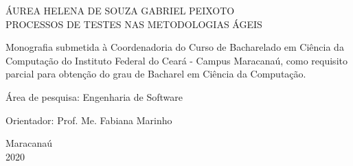 \begin{titlepage}
\vfill
\begin{center}

    {\large ÁUREA HELENA DE SOUZA GABRIEL PEIXOTO\\}
    \vspace{2cm}
    {\Large \textsc{PROCESSOS DE TESTES NAS METODOLOGIAS ÁGEIS}\\}
    \vspace{1cm}
    \hspace{.45\linewidth}
    \begin{minipage}{.50\linewidth}

            Monografia submetida à Coordenadoria do Curso de Bacharelado em Ciência da Computação do Instituto Federal do Ceará - Campus Maracanaú, como requisito 
            parcial para obtenção do grau de Bacharel em Ciência da Computação.

            \vspace{0.5 cm}

            Área de pesquisa: Engenharia de Software

            \vspace{0.5 cm}

            Orientador: Prof. Me. Fabiana Marinho
    
    \end{minipage}

    \vspace{2cm}
    \vfill
    {\large Maracanaú\\ 2020}
\end{center}

\end{titlepage}
